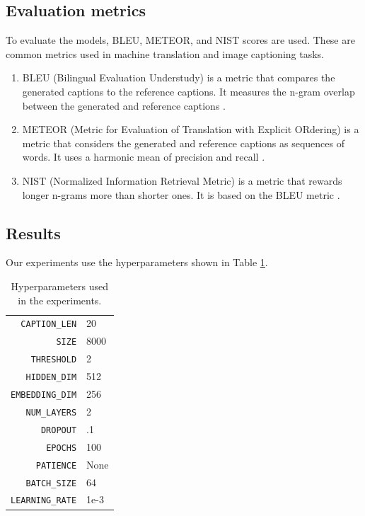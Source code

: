 \documentclass[12pt]{article}
\theoremstyle{plain}
\theoremstyle{definition}
\theoremstyle{remark}
\begin{document}
\subsection{Evaluation metrics}\label{sec:evaluation-metrics}
To evaluate the models, BLEU, METEOR, and NIST scores are used. These are common metrics used in machine translation and image captioning tasks.
\begin{enumerate}
    \item BLEU (Bilingual Evaluation Understudy) is a metric that compares the generated captions to the reference captions. It measures the n-gram overlap between the generated and reference captions \cite{papineni2002bleu}.
    \item METEOR (Metric for Evaluation of Translation with Explicit ORdering) is a metric that considers the generated and reference captions as sequences of words. It uses a harmonic mean of precision and recall \cite{banerjee2005meteor}.
    \item NIST (Normalized Information Retrieval Metric) is a metric that rewards longer n-grams more than shorter ones. It is based on the BLEU metric \cite{doddington2002nist}.
\end{enumerate}

\subsection{Results}\label{sec:results}
Our experiments use the hyperparameters shown in Table \ref{tab:hyperparameters}.
\begin{table}[H]
    \center
    \begin{tabular}{r|l}
        \texttt{CAPTION\_LEN} & 20 \\
        \texttt{SIZE} & 8000 \\
        \texttt{THRESHOLD} & 2 \\
        \texttt{HIDDEN\_DIM} & 512 \\
        \texttt{EMBEDDING\_DIM} & 256 \\
        \texttt{NUM\_LAYERS} & 2 \\
        \texttt{DROPOUT} & .1 \\
        \texttt{EPOCHS} & 100 \\
        \texttt{PATIENCE} & None \\
        \texttt{BATCH\_SIZE} & 64 \\
        \texttt{LEARNING\_RATE} & 1e-3
    \end{tabular}
    \caption{Hyperparameters used in the experiments.}\label{tab:hyperparameters}
\end{table}
\end{document}
